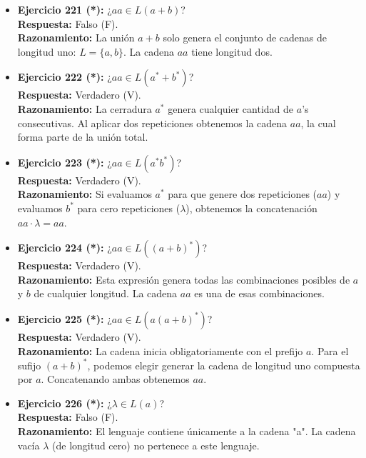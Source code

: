 \documentclass[12pt]{article}
\begin{document}
\begin{itemize}
    \vspace{0.2cm}
    \item \textbf{Ejercicio 221 (*):} ¿$aa \in L(a+b)$? \\
    \textbf{Respuesta:} Falso (F). \\
    \textbf{Razonamiento:} La unión $a+b$ solo genera el conjunto de cadenas de longitud uno: $L = \{a, b\}$. La cadena $aa$ tiene longitud dos.
    
    \vspace{0.2cm}
    \item \textbf{Ejercicio 222 (*):} ¿$aa \in L(a^*+b^*)$? \\
    \textbf{Respuesta:} Verdadero (V). \\
    \textbf{Razonamiento:} La cerradura $a^*$ genera cualquier cantidad de $a$'s consecutivas. Al aplicar dos repeticiones obtenemos la cadena $aa$, la cual forma parte de la unión total.
    
    \vspace{0.2cm}
    \item \textbf{Ejercicio 223 (*):} ¿$aa \in L(a^*b^*)$? \\
    \textbf{Respuesta:} Verdadero (V). \\
    \textbf{Razonamiento:} Si evaluamos $a^*$ para que genere dos repeticiones ($aa$) y evaluamos $b^*$ para cero repeticiones ($\lambda$), obtenemos la concatenación $aa \cdot \lambda = aa$.
    
    \vspace{0.2cm}
    \item \textbf{Ejercicio 224 (*):} ¿$aa \in L((a+b)^*)$? \\
    \textbf{Respuesta:} Verdadero (V). \\
    \textbf{Razonamiento:} Esta expresión genera todas las combinaciones posibles de $a$ y $b$ de cualquier longitud. La cadena $aa$ es una de esas combinaciones.
    
    \vspace{0.2cm}
    \item \textbf{Ejercicio 225 (*):} ¿$aa \in L(a(a+b)^*)$? \\
    \textbf{Respuesta:} Verdadero (V). \\
    \textbf{Razonamiento:} La cadena inicia obligatoriamente con el prefijo $a$. Para el sufijo $(a+b)^*$, podemos elegir generar la cadena de longitud uno compuesta por $a$. Concatenando ambas obtenemos $aa$.
    
    \vspace{0.2cm}
    \item \textbf{Ejercicio 226 (*):} ¿$\lambda \in L(a)$? \\
    \textbf{Respuesta:} Falso (F). \\
    \textbf{Razonamiento:} El lenguaje contiene únicamente a la cadena "a". La cadena vacía $\lambda$ (de longitud cero) no pertenece a este lenguaje.
    

\end{itemize}
\end{document}
